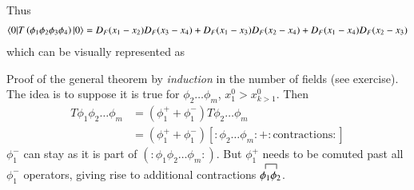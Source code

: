 Thus 
\begin{align*}
	\braket{0 | T \left(\phi_1 \phi_2 \phi_3 \phi_4 \right) | 0} = D_F (x_1 - x_2) D_F(x_3 - x_4) + D_F (x_1 - x_3) D_F(x_2 - x_4) + D_F (x_1 - x_4) D_F(x_2 - x_3) 
\end{align*}
which can be visually represented as
\begin{center}
\end{center}

Proof of the general theorem by \textit{induction} in the number of fields (see exercise). The idea is to suppose it is true for $\phi_2 \dots \phi_m$, $x^0_1 > x^0_{k>1}$. Then 
\begin{align*}
	T\phi_1 \phi_2 \dots \phi_m &= (\phi^+_{1} + \phi^-_{1})T\phi_2 \dots \phi_m \\
								& = (\phi^+_{1} + \phi^-_{1}) [:\phi_2 \dots \phi_m: + :\text{contractions}:]
\end{align*}
$\phi^-_1$ can stay as it is part of $(:\phi_1 \phi_2 \dots \phi_m:)$. But $\phi^+_1$ needs to be comuted past all $\phi^-_1$ operators, giving rise to additional contractions $\contraction{}{\phi_1}{}{\phi_2} \phi_1\phi_2$.

